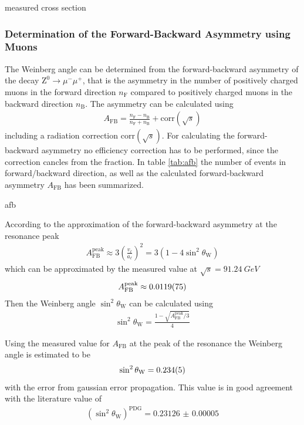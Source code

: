 \documentclass[11pt, a4paper]{article}
\numberwithin{equation}{section}
\begin{document}
\begin{table}
	\centering
	
	\caption{measured cross section}
\end{table}


\subsubsection{Determination of the Forward-Backward Asymmetry using Muons}
The Weinberg angle can be determined from the forward-backward asymmetry of the decay $\mathrm{Z}^0 \rightarrow \mu^- \mu^+$, that is the asymmetry in the number of positively charged muons in the forward direction $n_\mathrm{F}$ compared to positively charged muons in the backward direction $n_\mathrm{B}$.
The asymmetry can be calculated using
\begin{align*}
	A_\mathrm{FB} = \frac{n_\mathrm{F} - n_\mathrm{B}}{n_\mathrm{F} + n_\mathrm{B}} + \mathrm{corr}(\sqrt{s})
\end{align*}
including a radiation correction $\mathrm{corr}(\sqrt{s})$.
For calculating the forward-backward asymmetry no efficiency correction has to be performed, since the correction cancles from the fraction.
In table \ref{tab:afb} the number of events in forward/backward direction, as well as the calculated forward-backward asymmetry $A_\mathrm{FB}$ has been summarized.

\begin{table}
	\centering
	
	\caption{afb}
	\label{tab:afb}
\end{table}

According to the approximation of the forward-backward asymmetry at the resonance peak
\begin{align*}
	A_\mathrm{FB}^\mathrm{peak} \approx 3 \left( \frac{v_\ell}{a_\ell} \right)^2 = 3 \left( 1 - 4 \sin^2\theta_\mathrm{W} \right)
\end{align*}
which can be approximated by the measured value at $\sqrt{s} = \SI{91.24}{GeV}$
\begin{align*}
	A_\mathrm{FB}^\mathrm{peak} \approx \num{0.0119 +- 0.0075}
\end{align*}
Then the Weinberg angle $\sin^2\theta_\mathrm{W}$ can be calculated using
\begin{align*}
	\sin^2\theta_\mathrm{W} = \frac{1 - \sqrt{A_\mathrm{FB}^\mathrm{peak} / 3}}{4}
\end{align*}

Using the measured value for $A_\mathrm{FB}$ at the peak of the resonance the Weinberg angle is estimated to be
\begin{align*}
	\sin^2\theta_\mathrm{W} = \num{0.234 +- 0.005}
\end{align*}
with the error from gaussian error propagation.
This value is in good agreement with the literature value of
\begin{align*}
	(\sin^2\theta_\mathrm{W})^\mathrm{PDG} = \num{0.23126(5)}
\end{align*}
\end{document}
